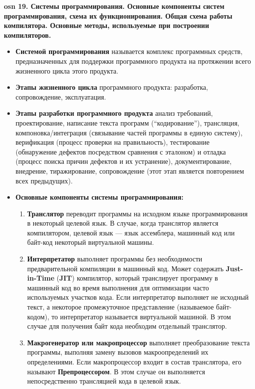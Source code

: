 \textbf{\LARGE osn 19. Системы программирования. Основные компоненты систем программирования, схема их функционирования. Общая схема работы компилятора. Основные методы, используемые при построении компиляторов.}

\begin{itemize}
    \item \textbf{Системой программирования} называется комплекс программных средств, предназначенных для поддержки программного продукта на протяжении всего жизненного цикла этого продукта.
    \item \textbf{Этапы жизненного цикла} программного продукта: разработка, сопровождение, эксплуатация.
    \item \textbf{Этапы разработки программного продукта}
        анализ требований,
        проектирование,
        написание текста программ (``кодирование''),
        трансляция, компоновка/интеграция (связывание частей программы в единую систему),
        верификация (процесс проверки на правильность), тестирование (обнаружение дефектов посредством сравнения с эталоном) и отладка (процесс поиска причин дефектов и их устранение),
        документирование,
        внедрение,
        тиражирование,
        сопровождение (этот этап является повторением всех предыдущих).
    \item \textbf{Основные компоненты системы программирования:}
    \begin{enumerate}
        \item \textbf{Транслятор} переводит программы на исходном языке программирования в некоторый целевой язык.
        В случае, когда транслятор является компилятором, целевой язык --- язык ассемблера, машинный код или байт-код некоторый виртуальной машины.
        \item \textbf{Интерпретатор} выполняет программы без необходимости предварительной компиляции в машинный код.
        Может содержать \textbf{Just-in-Time} (\textbf{JIT}) компилятор, который транслирует программу в машинный код во время выполнения для оптимизации часто используемых участков кода.
        Если интерпретатор выполняет не исходный текст, а некоторое промежуточное представление (называемое байт-кодом), то интерпретатор называется виртуальной машиной.
        В этом случае для получения байт кода необходим отдельный транслятор.
        \item \textbf{Макрогенератор или макропроцессор} выполняет преобразование текста программы, выполняя замену вызовов макроопределений их определениями.
        Если макропроцессор входит в состав транслятора, его называют \textbf{Препроцессором}. В этом случае он выполняется непосредственно трансляцией кода в целевой язык.

\end{enumerate}
\end{itemize}
